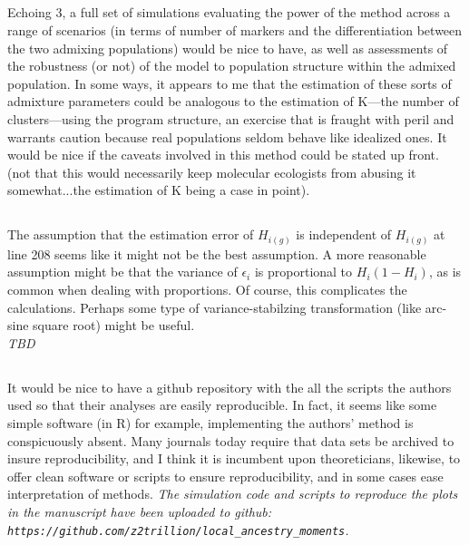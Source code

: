 \documentclass[11pt]{amsart}
\begin{document}
\subsection{} Echoing 3, a full set of simulations evaluating the power of the method across a range of scenarios (in
terms of number of markers and the differentiation between the two admixing populations) would be nice to
have, as well as assessments of the robustness (or not) of the model to population structure within the
admixed population. In some ways, it appears to me that the estimation of these sorts of admixture
parameters could be analogous to the estimation of K---the number of clusters---using the program
structure, an exercise that is fraught with peril and warrants caution because real populations seldom
behave like idealized ones. It would be nice if the caveats involved in this method could be stated up front.
(not that this would necessarily keep molecular ecologists from abusing it somewhat...the estimation of K
being a case in point).

\subsection{} The assumption that the estimation error of $H_{i(g)}$ is independent of $H_{i(g)}$ at line 208 seems like it
might not be the best assumption. A more reasonable assumption might be that the variance of $\epsilon_i$
is proportional to $H_i(1-H_i)$, as is common when dealing with proportions. Of course, this complicates the
calculations. Perhaps some type of variance-stabilzing transformation (like arc-sine square root) might be
useful.\\
\textit{TBD}

\subsection{} It would be nice to have a github repository with the all the scripts the authors used so that their
analyses are easily reproducible. In fact, it seems like some simple software (in R) for example,
implementing the authors' method is conspicuously absent. Many journals today require that data sets be
archived to insure reproducibility, and I think it is incumbent upon theoreticians, likewise, to offer clean
software or scripts to ensure reproducibility, and in some cases ease interpretation of methods.
\textit{The simulation code and scripts to reproduce the plots in the manuscript have been uploaded to github:  \texttt{https://github.com/z2trillion/local\_ancestry\_moments}.} 
\end{document}
